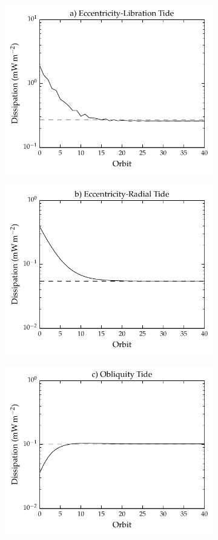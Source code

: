 \begin{figure}[!t]
\centering
\begin{subfigure}{\linewidth}
\centering
\includegraphics[width=0.8\linewidth]{Figures/ecc_lib_diss}
\subcaption{\label{fig:diss_a}}
\end{subfigure}\vspace*{-0.7cm}
\begin{subfigure}{\linewidth}
\centering
\includegraphics[width=0.8\linewidth]{Figures/ecc_rad_diss}
\subcaption{\label{fig:diss_b}}
\end{subfigure}\vspace*{-0.7cm}
\begin{subfigure}{\linewidth}
\centering
\includegraphics[width=0.8\linewidth]{Figures/obliq_diss}

\end{subfigure}
\end{figure}
